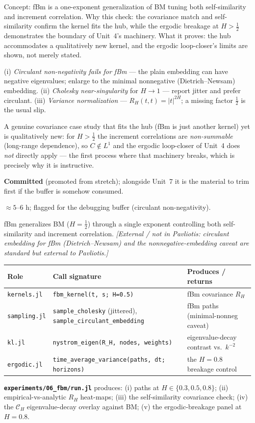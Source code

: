 \documentclass[11pt]{article}
\makeatletter
\newcommand{\extnote}[1]{{\small\color{extgray}\emph{[External / not in Pavliotis: #1]}}}
\newenvironment{unitmeta}{%
  \begin{description}[style=sameline,leftmargin=1.4cm,font=\bfseries\color{hubblue}]
}{%
  \end{description}
}
\newenvironment{contracttable}{%
  \par\smallskip\noindent{\bfseries\color{hubblue}Implementation contract.}\par\nopagebreak\smallskip
  \small
  \setlength{\extrarowheight}{2pt}%
  \noindent\begin{tabular}{@{}p{3.5cm}p{6.8cm}p{4.2cm}@{}}
  \toprule
  \textbf{Role} & \textbf{Call signature} & \textbf{Produces / returns} \\
  \midrule
}{%
  \bottomrule
  \end{tabular}\par\smallskip
}
\makeatother
\begin{document}
\begin{unitmeta}
\item[README] Concept: fBm is a one-exponent generalization of BM tuning both self-similarity and increment correlation. Why this check: the covariance match and self-similarity confirm the kernel fits the hub, while the ergodic breakage at $H>\tfrac12$ demonstrates the boundary of Unit~4's machinery. What it proves: the hub accommodates a qualitatively new kernel, and the ergodic loop-closer's limits are shown, not merely stated.
\item[Missteps] (i) \emph{Circulant non-negativity fails for fBm} --- the plain embedding can have negative eigenvalues; enlarge to the minimal nonnegative (Dietrich--Newsam) embedding. (ii) \emph{Cholesky near-singularity} for $H\to1$ --- report jitter and prefer circulant. (iii) \emph{Variance normalization} --- $R_H(t,t)=|t|^{2H}$; a missing factor $\tfrac12$ is the usual slip.
\item[Purpose] A genuine covariance case study that fits the hub (fBm is just another kernel) yet is qualitatively new: for $H>\tfrac12$ the increment correlations are \emph{non-summable} (long-range dependence), so $C\notin L^1$ and the ergodic loop-closer of Unit~4 does \emph{not} directly apply --- the first process where that machinery breaks, which is precisely why it is instructive.
\item[Status] \textbf{Committed} (promoted from stretch); alongside Unit~7 it is the material to trim first if the buffer is somehow consumed.
\item[Effort] $\approx 5$--$6$ h; flagged for the debugging buffer (circulant non-negativity).
\item[Prerequisite] fBm generalizes BM ($H=\tfrac12$) through a single exponent controlling both self-similarity and increment correlation. \extnote{circulant embedding for fBm (Dietrich--Newsam) and the nonnegative-embedding caveat are standard but external to Pavliotis.}
\end{unitmeta}

\begin{contracttable}
\texttt{kernels.jl} & \texttt{fbm\_kernel(t, s; H=0.5)} & fBm covariance $R_H$ \\
\texttt{sampling.jl} & \texttt{sample\_cholesky} (jittered), \texttt{sample\_circulant\_embedding} & fBm paths (minimal-nonneg caveat) \\
\texttt{kl.jl} & \texttt{nystrom\_eigen(R\_H, nodes, weights)} & eigenvalue-decay contrast vs.\ $k^{-2}$ \\
\texttt{ergodic.jl} & \texttt{time\_average\_variance(paths, dt; horizons)} & the $H=0.8$ breakage control \\
\end{contracttable}
\noindent\textbf{\texttt{experiments/06\_fbm/run.jl}} produces: (i) paths at $H\in\{0.3,0.5,0.8\}$; (ii) empirical-vs-analytic $R_H$ heat-maps; (iii) the self-similarity covariance check; (iv) the $\mathcal{C}_H$ eigenvalue-decay overlay against BM; (v) the ergodic-breakage panel at $H=0.8$.
\end{document}
